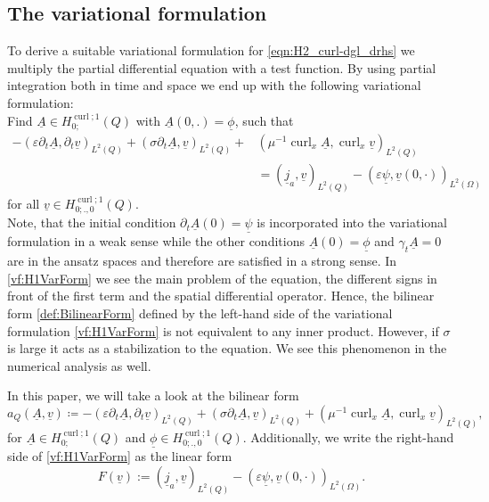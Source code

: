 \documentclass[a4paper,11pt]{article}
\newcommand{\cu}{\operatorname{curl}}
\renewcommand{\vec}[1]{\underline{#1}}
\begin{document}
\subsection{The variational formulation}
To derive a suitable variational formulation for \eqref{eqn:H2_curl-dgl_drhs} we multiply the partial differential equation with a test function. By using partial integration both in time  and space we end up with the following variational formulation:\\
Find $ \vec A\in H^{\cu;1}_{0;}(Q) $ with $\vec A(0,.)=\vec \phi$, such that
\begin{align}
	\label{vf:H1VarForm}
	-\left(\varepsilon\partial_t \vec A,\partial_t \vec v\right)_{L^2(Q)} + \left( \sigma\partial_t \vec A , \vec v\right)_{L^2(Q)}+&\left(\mu^{-1}	\cu_x  \vec A, \cu_x \vec v\right)_{L^2(Q)} \\
	\nonumber
	&= \left(\vec  j_a, \vec v\right)_{L^2(Q)} -\left(\varepsilon	\vec \psi, \vec v(0,\cdot)\right)_{L^2(\Omega)} 
\end{align}
for all $\vec v\in H^{\cu;1}_{0;.,0}(Q) $.\\
Note, that the initial condition $\partial_t \vec A(0)=\vec \psi$ is incorporated into the variational formulation in a weak sense while the other conditions $\vec A(0)=\vec \phi$ and $\gamma_t \vec A=0$ are in the ansatz spaces and therefore are satisfied in a strong sense. In \eqref{vf:H1VarForm} we see the main problem of the equation, the different signs in front of the first term and the spatial differential operator. Hence, the bilinear form \eqref{def:BilinearForm} defined by the left-hand side of the variational formulation \eqref{vf:H1VarForm} is not equivalent to any inner product. However, if $\sigma$ is large it acts as a stabilization to the equation.  We  see this phenomenon in the numerical analysis as well.

In this paper, we will take a look at the bilinear form
\begin{equation}\label{def:BilinearForm}
	a_Q(\vec A,\vec v) \coloneqq 	-(\varepsilon\partial_{t}\vec A, \partial_t \vec v)_{L^2(Q)}+(\sigma \partial_t \vec A,\vec v)_{L^2(Q)}  +(\mu^{-1}\cu_x  \vec A, \cu_x \vec v)_{L^2(Q)},
\end{equation}
for  $\vec A\in H^{\cu;1}_{0;}(Q)$ and $\vec\phi\in  H^{\cu;1}_{0;.,0}(Q)$. Additionally, we write the right-hand side of \eqref{vf:H1VarForm} as the linear form
\begin{equation}\label{def:LinearForm}
	F(\vec v) := \left(\vec  j_a, \vec v\right)_{L^2(Q)} -\left(\varepsilon	\vec \psi, \vec v(0,\cdot)\right)_{L^2(\Omega)}.
\end{equation}
\end{document}
